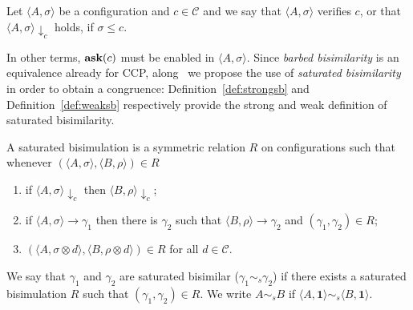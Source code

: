 \documentclass{llncs}
\newcommand{\ask}{{\bf ask}}
\def\monid{{\mathbf 0}}
\def\monid{\mathbf{1}}
\begin{document}
\begin{definition} [Barbs]
Let $\langle A, \sigma \rangle$ be a configuration and $c \in \mathcal{C}$
and we say that $\langle A, \sigma \rangle$ verifies $c$, or that $\langle A, \sigma \rangle \downarrow_c$ holds, if  $\sigma \leq c$.
\end{definition}

In other terms, $\hbox{\ask}(c)$ must be enabled in $\langle A, \sigma \rangle$.
%
Since \emph{barbed bisimilarity} is an equivalence already for CCP, along~\cite{pippo}
we propose the use of \emph{saturated bisimilarity}
in order to obtain a congruence:
%
Definition~\ref{def:strongsb} and Definition~\ref{def:weaksb} respectively provide the strong and weak definition of saturated bisimilarity.

\begin{definition}\label{def:strongsb} A saturated bisimulation is a symmetric relation $R$ on configurations such that whenever
$( \langle A, \sigma \rangle,\langle B, \rho \rangle) \in R$
\begin{enumerate}
\item if $\langle A, \sigma \rangle \downarrow_c$ then $\langle B, \rho \rangle \downarrow_c$;
\item if $\langle A, \sigma \rangle \to \gamma_1$ then there is $\gamma_2$ such that $\langle B, \rho \rangle \to \gamma_2$ and $(\gamma_1, \gamma_2) \in R$;
\item $(\langle A,\sigma \otimes d\rangle, \langle B,\rho \otimes d \rangle) \in R$ for  all $d \in \mathcal{C}$.
\end{enumerate}
We say that $\gamma_1$ and $\gamma_2$ are  saturated bisimilar ($\gamma_1  \sim_{\mathit{s}} \gamma_2$) if there exists a  saturated  bisimulation $R$ such that $(\gamma_1 , \gamma_2 ) \in R$. We write $A \sim_{\mathit{s}} B$ if $\langle A, \monid \rangle \sim_{\mathit{s}} \langle B, \monid \rangle$.
\end{definition}
\end{document}
